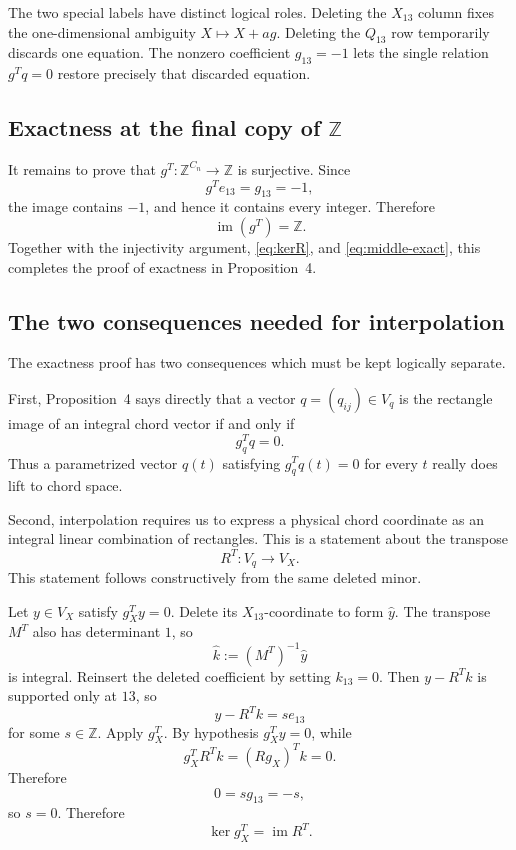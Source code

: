 \documentclass[11pt]{article}
\theoremstyle{definition}
\newcommand{\Z}{\mathbb Z}
\newcommand{\im}{\operatorname{im}}
\begin{document}
The two special labels have distinct logical roles.  Deleting the
$X_{13}$ column fixes the one-dimensional ambiguity $X\mapsto X+ag$.
Deleting the $Q_{13}$ row temporarily discards one equation.  The nonzero
coefficient $g_{13}=-1$ lets the single relation $g^Tq=0$ restore precisely
that discarded equation.

\subsection{Exactness at the final copy of \texorpdfstring{$\Z$}{Z}}

It remains to prove that $g^T:\Z^{C_n}\to\Z$ is surjective.  Since
\[
 g^T e_{13}=g_{13}=-1,
\]
the image contains $-1$, and hence it contains every integer.  Therefore
\[
 \im(g^T)=\Z.
\]
Together with the injectivity argument, \eqref{eq:kerR}, and \eqref{eq:middle-exact}, this completes the proof of exactness in
Proposition~4.


\subsection{The two consequences needed for interpolation}

The exactness proof has two consequences which must be kept logically separate.

First, Proposition~4 says directly that a vector \(q=(q_{ij})\in V_q\) is the rectangle image of an integral chord vector if and only if
\begin{equation}
g_q^Tq=0.
\label{eq:legitimate-q}
\end{equation}
Thus a parametrized vector \(q(t)\) satisfying \(g_q^Tq(t)=0\) for every \(t\) really does lift to chord space.

Second, interpolation requires us to express a physical chord coordinate as an integral linear combination of rectangles.  This is a statement about the transpose
\[
R^T:V_q\longrightarrow V_X.
\]
This statement follows constructively from the same deleted minor.

Let \(y\in V_X\) satisfy \(g_X^Ty=0\).  Delete its \(X_{13}\)-coordinate to form \(\widehat y\).  The transpose \(M^T\) also has determinant \(1\), so
\[
\widehat k:=(M^T)^{-1}\widehat y
\]
is integral.  Reinsert the deleted coefficient by setting \(k_{13}=0\).  Then \(y-R^Tk\) is supported only at \(13\), so
\[
y-R^Tk=s e_{13}
\]
for some \(s\in\Z\).  Apply \(g_X^T\).  By hypothesis \(g_X^Ty=0\), while
\[
g_X^TR^Tk=(Rg_X)^Tk=0.
\]
Therefore
\[
0=s g_{13}=-s,
\]
so \(s=0\).  Therefore
\begin{equation}
\ker g_X^T=\im R^T.
\label{eq:prop4-transpose-exact}
\end{equation}
\end{document}
